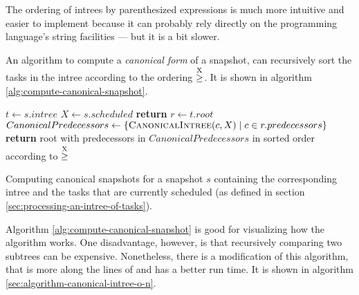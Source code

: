 The ordering of intrees by parenthesized expressions is much more intuitive and easier to implement because it can probably rely directly on the programming language's string facilities --- but it is a bit slower.

An algorithm to compute a \emph{canonical form} of a snapshot, can recursively sort the tasks in the intree according to the ordering $\stackrel{\text{X}}{\geq}$. It is shown in algorithm \ref{alg:compute-canonical-snapshot}.

\begin{algorithm}
  \begin{algorithmic}
     
    \State $t \gets s.intree$ 
    \State $X \gets s.scheduled$ 
    \State \textbf{return}  
    \EndProcedure
    \Statex
    \State $r \gets t.root$ 
    \State $CanonicalPredecessors \gets 
           \left\{ \Call{CanonicalIntree}{c, X} \mid c \in r.predecessors \right\}$
    \State \textbf{return} root with predecessors in $CanonicalPredecessors$ in sorted order according to $\stackrel{\text{X}}{\geq}$
    \EndProcedure
    \Statex
  \end{algorithmic}
  \caption{Computing canonical snapshots for a snapshot $s$ containing the corresponding intree and the tasks that are currently scheduled (as defined in section \ref{sec:processing-an-intree-of-tasks}).}
  \label{alg:compute-canonical-snapshot}
\end{algorithm}

Algorithm \ref{alg:compute-canonical-snapshot} is good for visualizing how the algorithm works. One disadvantage, however, is that recursively comparing two subtrees can be expensive. Nonetheless, there is a modification of this algorithm, that is more along the lines of \cite{aho1974design} and has a better run time. It is shown in algorithm \ref{sec:algorithm-canonical-intree-o-n}.

